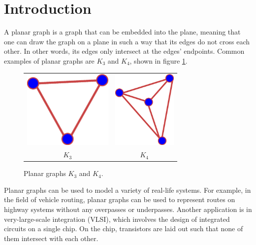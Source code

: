 \newtheorem{theorem}{Theorem}
\newtheorem{lemma}{Lemma}
\newtheorem{corollary}{Corollary}
\newtheorem{proposition}{Proposition}


\section{Introduction}
A planar graph is a graph that can be embedded into the plane, meaning that one can draw the graph on a plane in such a way that its edges do not cross each other. In other words, its edges only intersect at the edges' endpoints. Common examples of planar graphs are $K_3$ and $K_4$, shown in figure \ref{k3k4}.

\begin{figure}[h]
	\centering
	\begin{tabular}{c|c}
		\hline
		\includegraphics[height=1.5in]{k3.eps} & \includegraphics[height=1.5in]{k4.eps} \\ 
		\textbf{$K_3$} & \textbf{$K_4$} \\
		\hline
	\end{tabular}
		\caption{Planar graphs $K_3$ and $K_4$.}
\label{k3k4}
\end{figure}

Planar graphs can be used to model a variety of real-life systems. For example, in the field of vehicle routing, planar graphs can be used to represent routes on highway systems without any overpasses or underpasses. Another application is in very-large-scale integration (VLSI), which involves the design of integrated circuits on a single chip.  On the chip, transistors are laid out such that none of them intersect with each other.

